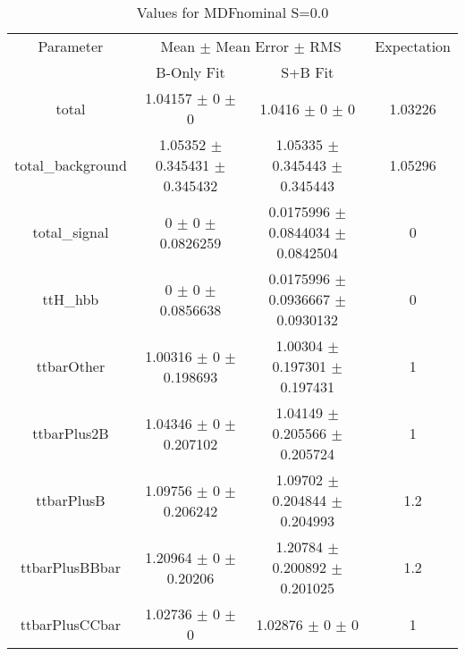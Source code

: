 \begin{table}
\centering
\caption{Values for MDFnominal S=0.0}
\begin{tabular}{cccc}
\toprule
Parameter & \multicolumn{2}{c}{Mean $\pm$ Mean Error $\pm$ RMS} & Expectation\\
 & B-Only Fit & S+B Fit & \\
\midrule
total & \num{1.04157} $\pm$ \num{0} $\pm$ \num{0} & \num{1.0416} $\pm$ \num{0} $\pm$ \num{0} & \num{1.03226}\\
total\_background & \num{1.05352} $\pm$ \num{0.345431} $\pm$ \num{0.345432} & \num{1.05335} $\pm$ \num{0.345443} $\pm$ \num{0.345443} & \num{1.05296}\\
total\_signal & \num{0} $\pm$ \num{0} $\pm$ \num{0.0826259} & \num{0.0175996} $\pm$ \num{0.0844034} $\pm$ \num{0.0842504} & \num{0}\\
ttH\_hbb & \num{0} $\pm$ \num{0} $\pm$ \num{0.0856638} & \num{0.0175996} $\pm$ \num{0.0936667} $\pm$ \num{0.0930132} & \num{0}\\
ttbarOther & \num{1.00316} $\pm$ \num{0} $\pm$ \num{0.198693} & \num{1.00304} $\pm$ \num{0.197301} $\pm$ \num{0.197431} & \num{1}\\
ttbarPlus2B & \num{1.04346} $\pm$ \num{0} $\pm$ \num{0.207102} & \num{1.04149} $\pm$ \num{0.205566} $\pm$ \num{0.205724} & \num{1}\\
ttbarPlusB & \num{1.09756} $\pm$ \num{0} $\pm$ \num{0.206242} & \num{1.09702} $\pm$ \num{0.204844} $\pm$ \num{0.204993} & \num{1.2}\\
ttbarPlusBBbar & \num{1.20964} $\pm$ \num{0} $\pm$ \num{0.20206} & \num{1.20784} $\pm$ \num{0.200892} $\pm$ \num{0.201025} & \num{1.2}\\
ttbarPlusCCbar & \num{1.02736} $\pm$ \num{0} $\pm$ \num{0} & \num{1.02876} $\pm$ \num{0} $\pm$ \num{0} & \num{1}\\
\bottomrule
\end{tabular}
\end{table}